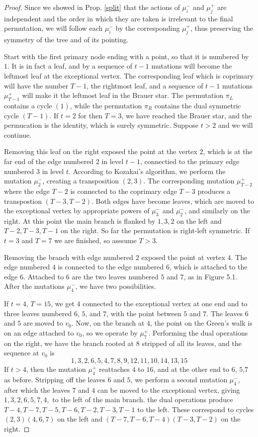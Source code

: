 \documentclass[11pt,english]{article}
\numberwithin{figure}{section}
\numberwithin{equation}{section}
\numberwithin{table}{section}
\theoremstyle{definition}
\theoremstyle{remark}
\begin{document}
\begin{proof}
	Since we showed in Prop. \ref{split} that the actions of $\mu_i^-$ and $\mu_j^+$ are independent and the order in which they are taken is irrelevant to the final permutation, we will follow each $\mu_i^-$ by the corresponding $\mu_j^+$, thus preserving the symmetry of the tree and of its pointing. 
	
	Start with the first primary node ending with a point, so that it is numbered by $1$. It is in fact a leaf, and by a sequence of $t-1$ mutations will become the leftmost leaf at the exceptional vertex.  The corresponding leaf which is coprimary will have the number $T-1$, the rightmost leaf, and a sequence of $t-1$ mutations $\mu_{T-1}^+ $ will make it the leftmost leaf in the Brauer star. The permutation $\pi_L$ contains a cycle $(1)$, while the permutation $\pi_R$ contains the dual symmetric cycle $(T-1)$. If $t=2$ for then $T=3$, we have reached the Brauer star, and the permucation is the identity, which is surely symmetric. Suppose $t>2$ and we will continue.
	
	Removing this leaf on the right exposed the point at the vertex $2$, which is at the far end of the edge numbered $2$ in level $t-1$, connectied to the primary edge numbered $3$ in level $t$.  According to Kozakai's algorithm, we perform the mutation $\mu_{2}^-$, creating a transposition $(2,3)$. The corresponding mutation $\mu_{T-2}^+$ where the edge $T-2$ is connected to the coprimary edge $T-3$ produces a transpostion $(T-3,T-2)$. Both edges have become leaves, which are moved to the exceptional vertex by appropriate powers of $\mu_3^-$ and $\mu_2^-$, and similarly on the right.  At this point the main branch is flanked by $1,3,2$ on the left and $T-2,T-3,T-1$ on the right. So far the permutation is right-left symmetric. If $t=3$ and $T=7$ we are finished, so asssume $T>3$.
	
	Removing the branch with edge numbered $2$ exposed the point at vertex $4$. The edge numbered $4$ is connected to the edge numbered $6$, which is attached to the edge $6$. Attached to $6$ are the two leaves numbered $5$ and $7$, as in Figure 5.1. After the mutations $\mu_4^-$, we have two possibilities.  
	
	If $t=4$, $T=15$, we get $4$ connected to the exceptional vertex at one end and to three leaves numbered $6$, $5$, and $7$, with the point between $5$ and $7$. The leaves $6$ and $5$ are moved to $v_0$.  Now, on the branch at $4$, the point on the Green's walk is on an edge attached to $v_0$, so we operate by $\mu_7^+$.  Performing the dual operations on the right, we have the branch rooted at $8$ stripped of all its leaves, and the sequence at $v_0$ is 
	\[
	1,3,2,6,5,4,7,8,9,12,11,10,14,13,15
	\]
	If $t>4$, then the mutation $\mu_4^+$ reattaches $4$ to $16$, and at the other end to $6$, $5$,$7$  as before.  Stripping off the leaves $6$ and $5$, we perform a second mutation
	$\mu_4^-$, after which the leaves $7$ and $4$ can be moved to the exceptional vertex, giving $1,3,2,6,5,7,4,$ to the left of the main branch.  the dual operations produce
	$T-4,T-7,T-5,T-6,T-2,T-3,T-1$ to the left.  These correspond to cycles $(2,3)(4,6,7)$ on the left and $(T-7, T-6,T-4)(T-3,T-2)$ on the right.
	

\end{proof}
\end{document}
